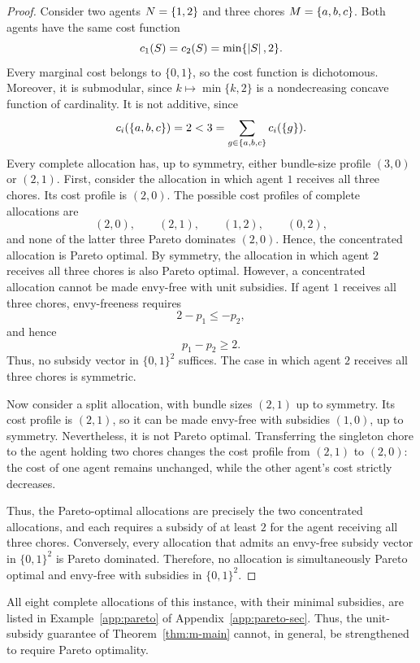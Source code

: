 \begin{proof}
Consider two agents $N=\left\{1,2\right\}$ and three chores $M=\left\{a,b,c\right\}$.
Both agents have the same cost function
\[
  c_1(S)=c_2(S)=\min\{\left\lvert S\right\rvert,2\}.
\]
Every marginal cost belongs to $\{0,1\}$, so the cost function is dichotomous.
Moreover, it is submodular, since $k\mapsto\min\{k,2\}$ is a nondecreasing
concave function of cardinality. It is not additive, since
\[
  c_i(\left\{a,b,c\right\})=2<3
  =\sum_{g\in\left\{a,b,c\right\}}c_i(\left\{g\right\}).
\]
Every complete allocation has, up to symmetry, either bundle-size profile
$(3,0)$ or $(2,1)$. First, consider the allocation in which agent $1$ receives
all three chores. Its cost profile is $(2,0)$. The possible cost profiles of
complete allocations are
\[
  (2,0),\qquad (2,1),\qquad (1,2),\qquad (0,2),
\]
and none of the latter three Pareto dominates $(2,0)$. Hence, the concentrated
allocation is Pareto optimal. By symmetry, the allocation in which agent $2$
receives all three chores is also Pareto optimal. However, a concentrated
allocation cannot be made envy-free with unit subsidies. If agent $1$ receives
all three chores, envy-freeness requires
\[
  2-p_1\leq -p_2,
\]
and hence
\[
  p_1-p_2\geq 2.
\]
Thus, no subsidy vector in $\{0,1\}^2$ suffices. The case in which agent $2$
receives all three chores is symmetric.

Now consider a split allocation, with bundle sizes $(2,1)$ up to symmetry. Its
cost profile is $(2,1)$, so it can be made envy-free with subsidies $(1,0)$, up
to symmetry. Nevertheless, it is not Pareto optimal. Transferring the singleton
chore to the agent holding two chores changes the cost profile from $(2,1)$ to
$(2,0)$: the cost of one agent remains unchanged, while the other agent's cost
strictly decreases.

Thus, the Pareto-optimal allocations are precisely the two concentrated
allocations, and each requires a subsidy of at least $2$ for the agent receiving
all three chores. Conversely, every allocation that admits an envy-free subsidy
vector in $\{0,1\}^2$ is Pareto dominated. Therefore, no allocation is
simultaneously Pareto optimal and envy-free with subsidies in $\{0,1\}^2$.
\end{proof}

All eight complete allocations of this instance, with their minimal subsidies,
are listed in Example~\ref{app:pareto} of Appendix~\ref{app:pareto-sec}. Thus,
the unit-subsidy guarantee of Theorem~\ref{thm:m-main} cannot, in general, be
strengthened to require Pareto optimality.

